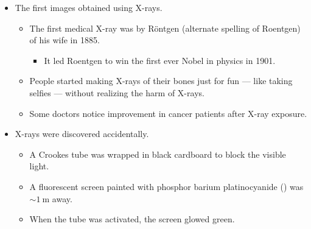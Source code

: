 \documentclass[../notes.tex]{subfiles}
\begin{document}
\begin{itemize}
\begin{itemize}
\begin{itemize}
            \item Cold cathode vacuum tubes (no heated filament; these emit more electrons than can be supplied by thermionic emission alone).
            \item Relies on electron emission induced by an electrostatic field or secondary electron emission.
            \item Requires a small amount of gas (air) in them to function (\SIrange{e-6}{5e-8}{\atmosphere}).
            \item High voltage is applied to the tube.
            \item Electric current causes the ionization of gas molecules: Electrons "knock off" electrons from other gas molecules forming positive ions an negative electrons (negative ions are also formed as a result of electron interactions with neutral gas molecules).
            \item High velocity electrons hit the anode (metal) that creates the X-rays.
        \end{itemize}
    \end{itemize}
    \item The first images obtained using X-rays.
    \begin{itemize}
        \item The first medical X-ray was by R\"{o}ntgen (alternate spelling of Roentgen) of his wife in 1885.
        \begin{itemize}
            \item It led Roentgen to win the first ever Nobel in physics in 1901.
        \end{itemize}
        \item People started making X-rays of their bones just for fun --- like taking selfies --- without realizing the harm of X-rays.
        \item Some doctors notice improvement in cancer patients after X-ray exposure.
    \end{itemize}
    \item X-rays were discovered accidentally.
    \begin{itemize}
        \item A Crookes tube was wrapped in black cardboard to block the visible light.
        \item A fluorescent screen painted with phosphor barium platinocyanide () was $\sim\SI{1}{\meter}$ away.
        \item When the tube was activated, the screen glowed green.

\end{itemize}
\end{itemize}
\end{document}
